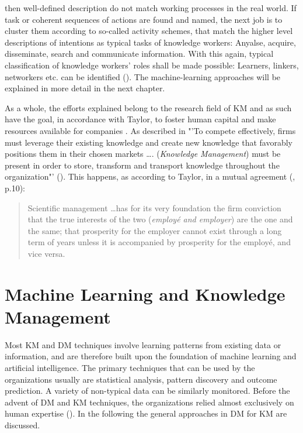 then well-defined description do not match working processes in the real world. If task or coherent sequences of actions are found and named, the next job is to cluster them according to so-called activity schemes, that match the higher level descriptions of intentions as typical tasks of knowledge workers: Anyalse, acquire, disseminate, search and communicate information. With this again, typical classification of knowledge workers' roles shall be made possible: Learners, linkers, networkers etc. can be identified (\cite{reinhardt2011knowledge}). The machine-learning approaches will be explained in more detail in the next chapter. 

As a whole, the efforts explained belong to the research field of \ac{KM} and as such have the goal, in accordance with Taylor, to foster human capital and make resources available for companies . As described in \: "'To compete effectively, firms must leverage their existing knowledge and create new knowledge that favorably positions them in their chosen markets \dots. (\textit{Knowledge Management}) must be present in order to store, transform and transport knowledge throughout the organization"' (\cite{gold2001knowledge}). This happens, as according to Taylor, in a mutual agreement (\cite{taylor2013scientific}, p.10):
\begin{quotation}
Scientific management \dots has for its very foundation the firm conviction that the true interests of the two (\textit{employé and employer}) are the one and the same; that prosperity for the employer cannot exist through a long term of years unless it is accompanied by prosperity for the employé, and vice versa.
\end{quotation}

\section{Machine Learning and Knowledge Management}
Most KM and \ac{DM} techniques involve learning patterns from existing data or information, and are therefore built upon the foundation of machine learning and artificial intelligence. The primary techniques that can be used by the organizations usually are statistical analysis, pattern discovery and outcome prediction. A variety of non-typical data can be similarly monitored. Before the advent of \acs{DM} and \acs{KM} techniques, the organizations relied almost exclusively on human expertise (\cite{tsai2012knowledge}). In the following the general approaches in \acs{DM} for \acs{KM} are discussed.

